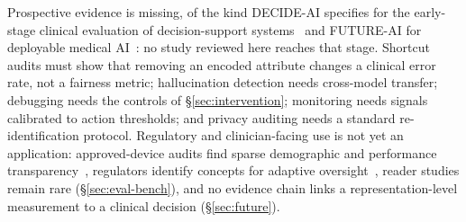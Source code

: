 Prospective evidence is missing, of the kind DECIDE-AI specifies for the early-stage clinical
evaluation of decision-support systems~\cite{vasey2022decide} and FUTURE-AI for deployable medical
AI~\cite{lekadir2023future}: no study reviewed here reaches that stage.
Shortcut audits must show that removing an encoded attribute changes a clinical error rate, not a fairness
metric; hallucination detection needs cross-model
transfer; debugging needs the controls of \S\ref{sec:intervention}; monitoring needs signals calibrated
to action thresholds; and privacy auditing needs a standard re-identification protocol.
Regulatory and clinician-facing use is not yet an application: approved-device audits find sparse
demographic and performance transparency~\cite{muralidharan2024a,mehta2025evaluating}, regulators
identify concepts for adaptive oversight~\cite{warraich2024fda}, reader studies remain rare
(\S\ref{sec:eval-bench}), and no evidence chain links a representation-level measurement to a clinical
decision (\S\ref{sec:future}).


